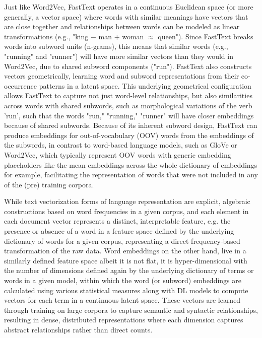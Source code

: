 \documentclass[final]{clv2025}
\begin{document}
Just like Word2Vec, FastText operates in a continuous Euclidean space (or more generally, a vector space) where words with similar meanings have vectors that are close together and relationships between words can be modeled as linear transformations (e.g., "king $-$ man $+$ woman $\approx$ queen"). Since FastText breaks words into subword units (n-grams), this means that similar words (e.g., "running" and "runner") will have more similar vectors than they would in Word2Vec, due to shared subword components ("run"). FastText also constructs vectors geometrically, learning word and subword representations from their co-occurrence patterns in a latent space. This underlying geometrical configuration allows FastText to capture not just word-level relationships, but also similarities across words with shared subwords, such as morphological variations of the verb 'run', such that the words "run," "running," "runner" will have closer embeddings because of shared subwords. Because of its inherent subword design, FastText can produce embeddings for out-of-vocabulary (OOV) words from the embeddings of the subwords, in contrast to word-based language models, such as GloVe or Word2Vec, which typically represent OOV words with generic embedding placeholders like the mean embeddings across the whole dictionary of embeddings for example, facilitating the representation of words that were not included in any of the (pre) training corpora.

While text vectorization forms of language representation are explicit, algebraic constructions based on word frequencies in a given corpus, and each element in each document vector represents a distinct, interpretable feature, e.g. the presence or absence of a word in a feature space defined by the underlying dictionary of words for a given corpus, representing a direct frequency-based transformation of the raw data. Word embeddings on the other hand, live in a similarly defined feature space albeit it is not flat, it is hyper-dimensional with the number of dimensions defined again by the underlying dictionary of terms or words in a given model, within which the word (or subword) embeddings are calculated using various statistical measures along with DL models to compute vectors for each term in a continuous latent space. These vectors are learned through training on large corpora to capture semantic and syntactic relationships, resulting in dense, distributed representations where each dimension captures abstract relationships rather than direct counts. 
\end{document}
